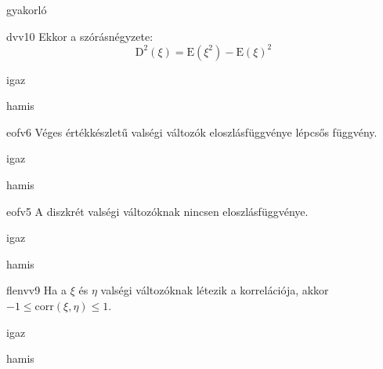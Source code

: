 \documentclass[12pt]{article}
\begin{document}
\begin{quiz}{gyakorló}
\begin{multi}[feedback={Def./tulajdonság}]{dvv10}
Ekkor a szórásnégyzete:
$$
\mathrm{D}^2(\xi)=\mathrm{E}(\xi^2)-\mathrm{E}(\xi)^2
$$
\item* igaz
\item hamis
\end{multi}
\begin{multi}[feedback={Az $F(x)=\mathrm{P}(\xi<x)$ konstans az $(a,b)$-n ha $a$ és $b$ két szomszédos eleme az értékkészletnek.}]{eofv6}
Véges értékkészletű valségi változók eloszlásfüggvénye lépcsős függvény.
\item* igaz
\item hamis
\end{multi}
\begin{multi}[feedback={Mindegyiknek van, definíció szerint.}]{eofv5}
A diszkrét valségi változóknak nincsen eloszlásfüggvénye.
\item igaz
\item* hamis
\end{multi}
\begin{multi}[feedback={Tulajdonság,tétel.}]{flenvv9}
Ha a $\xi$ és $\eta$ valségi változóknak létezik a korrelációja, akkor $-1\le \mathrm{corr}(\xi,\eta)\le 1$.
\item* igaz
\item hamis
\end{multi}
\end{quiz}
\end{document}
